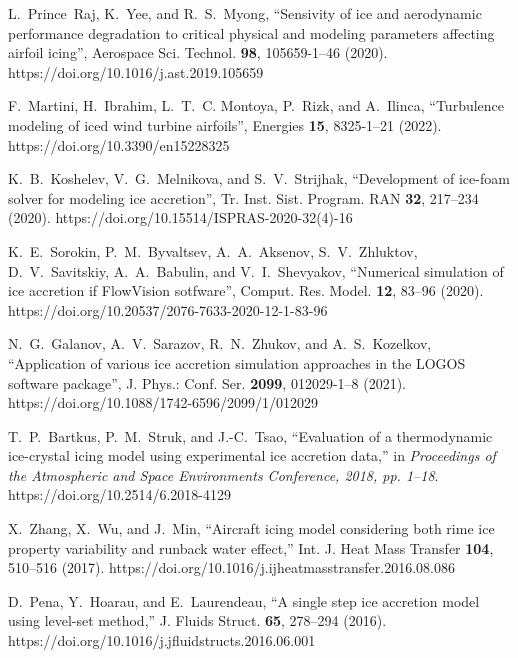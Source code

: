 \documentclass[
11pt,%
tightenlines,%
twoside,%
onecolumn,%
nofloats,%
nobibnotes,%
nofootinbib,%
superscriptaddress,%
noshowpacs,%
centertags]%
{revtex4}
\begin{document}
\begin{thebibliography}{99}

L.~Prince~Raj, K.~Yee, and R.~S.~Myong, \textquotedblleft Sensivity of ice and aerodynamic performance degradation to critical physical and modeling parameters affecting airfoil icing\textquotedblright, Aerospace Sci. Technol. \textbf{98}, 105659-1--46 (2020). https://doi.org/10.1016/j.ast.2019.105659

F.~Martini, H.~Ibrahim, L.~T.~C. Montoya, P.~Rizk, and A.~Ilinca, \textquotedblleft Turbulence modeling of iced wind turbine airfoils\textquotedblright, Energies \textbf{15}, 8325-1--21 (2022). https://doi.org/10.3390/en15228325

K.~B.~Koshelev, V.~G.~Melnikova, and S.~V.~Strijhak, \textquotedblleft Development of ice-foam solver for modeling ice accretion\textquotedblright, Tr. Inst. Sist. Program. RAN \textbf{32}, 217--234 (2020). https://doi.org/10.15514/ISPRAS-2020-32(4)-16

K.~E.~Sorokin, P.~M.~Byvaltsev, A.~A.~Aksenov, S.~V.~Zhluktov, D.~V.~Savitskiy, A.~A.~Babulin, and V.~I.~Shevyakov, \textquotedblleft Numerical simulation of ice accretion if FlowVision sotfware\textquotedblright, Comput. Res. Model. \textbf{12}, 83--96 (2020). https://doi.org/10.20537/2076-7633-2020-12-1-83-96

N.~G.~Galanov, A.~V.~Sarazov, R.~N.~Zhukov, and A.~S.~Kozelkov, \textquotedblleft Application of various ice accretion simulation approaches in the LOGOS software package\textquotedblright, J. Phys.: Conf. Ser. \textbf{2099}, 012029-1--8 (2021). https://doi.org/10.1088/1742-6596/2099/1/012029

T.~P.~Bartkus, P.~M.~Struk, and J.-C.~Tsao, “Evaluation of a thermodynamic ice-crystal icing model using experimental ice accretion data,” in \textit{Proceedings of the Atmospheric and Space Environments Conference, 2018, pp. 1--18}. https://doi.org/10.2514/6.2018-4129

X.~Zhang, X.~Wu, and J.~Min, “Aircraft icing model considering both rime ice property variability and runback water effect,” Int. J. Heat Mass Transfer \textbf{104}, 510--516 (2017). https://doi.org/10.1016/j.ijheatmasstransfer.2016.08.086

D.~Pena, Y.~Hoarau, and E.~Laurendeau, “A single step ice accretion model using level-set method,” J. Fluids Struct. \textbf{65}, 278--294 (2016). https://doi.org/10.1016/j.jfluidstructs.2016.06.001


\end{thebibliography}
\end{document}
